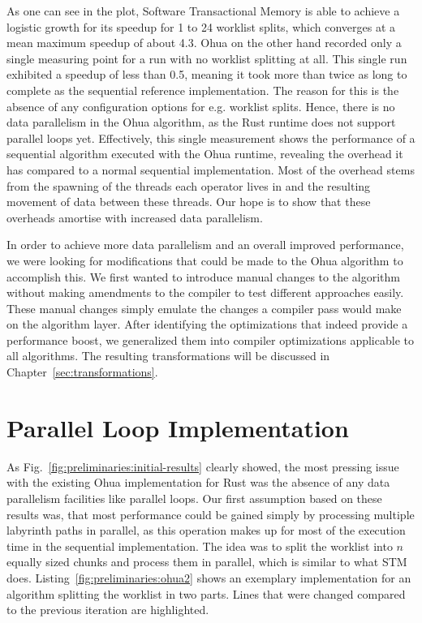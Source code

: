 As one can see in the plot, Software Transactional Memory is able to achieve a logistic growth for its speedup for 1 to 24 worklist splits, which converges at a mean maximum speedup of about 4.3.
Ohua on the other hand recorded only a single measuring point for a run with no worklist splitting at all.
This single run exhibited a speedup of less than 0.5, meaning it took more than twice as long to complete as the sequential reference implementation.
The reason for this is the absence of any configuration options for e.g. worklist splits.
Hence, there is no data parallelism in the Ohua algorithm, as the Rust runtime does not support parallel loops yet.
Effectively, this single measurement shows the performance of a sequential algorithm executed with the Ohua runtime, revealing the overhead it has compared to a normal sequential implementation.
Most of the overhead stems from the spawning of the threads each operator lives in and the resulting movement of data between these threads.
Our hope is to show that these overheads amortise with increased data parallelism.

In order to achieve more data parallelism and an overall improved performance, we were looking for modifications that could be made to the Ohua algorithm to accomplish this.
We first wanted to introduce manual changes to the algorithm without making amendments to the compiler to test different approaches easily.
These manual changes simply emulate the changes a compiler pass would make on the algorithm layer.
After identifying the optimizations that indeed provide a performance boost, we generalized them into compiler optimizations applicable to all algorithms.
The resulting transformations will be discussed in Chapter~\ref{sec:transformations}.


\section{Parallel Loop Implementation}%
\label{sec:preliminary:tf1}

As Fig.~\ref{fig:preliminaries:initial-results} clearly showed, the most pressing issue with the existing Ohua implementation for Rust was the absence of any data parallelism facilities like parallel loops.
Our first assumption based on these results was, that most performance could be gained simply by processing multiple labyrinth paths in parallel, as this operation makes up for most of the execution time in the sequential implementation.
The idea was to split the worklist into $n$ equally sized chunks and process them in parallel, which is similar to what STM does.
Listing~\ref{fig:preliminaries:ohua2} shows an exemplary implementation for an algorithm splitting the worklist in two parts.
Lines that were changed compared to the previous iteration are highlighted.

